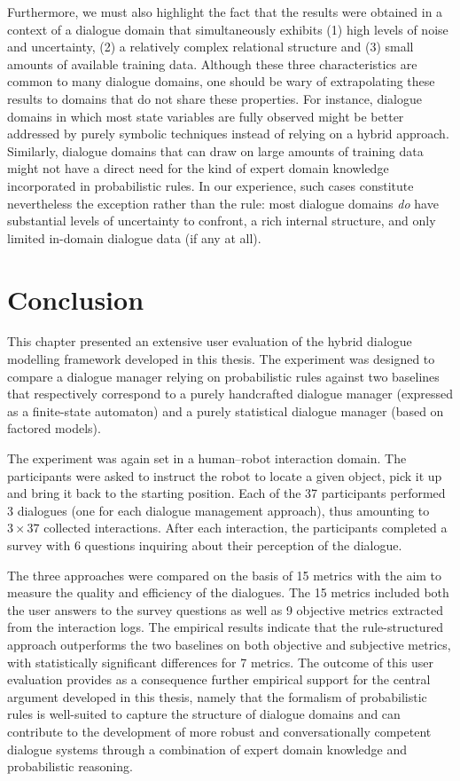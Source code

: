 Furthermore, we must also highlight the fact that the results were obtained in a context of a dialogue domain that simultaneously exhibits (1) high levels of noise and uncertainty, (2) a relatively complex relational structure and (3) small amounts of available training data.  Although these three characteristics are common to many  dialogue domains, one should be wary of extrapolating these results to domains that do not share these properties.  For instance, dialogue domains in which most state variables are fully observed might be better addressed by purely symbolic techniques instead of relying on a hybrid approach. Similarly, dialogue domains that can draw on large amounts of training data might not have a direct need for the kind of expert domain knowledge incorporated in probabilistic rules.   In our experience, such cases constitute nevertheless the exception rather than the rule: most dialogue domains \textit{do} have substantial levels of uncertainty to confront, a rich internal structure, and only limited in-domain dialogue data (if any at all).


\section{Conclusion}

This chapter presented an extensive user evaluation of the hybrid dialogue modelling framework developed in this thesis.  The experiment was designed to compare a dialogue manager relying on probabilistic rules against two baselines that respectively correspond to a purely handcrafted dialogue manager (expressed as a finite-state automaton) and a purely statistical dialogue manager (based on factored models). 

The experiment was again set in a human--robot interaction domain.  The participants were asked to instruct the robot to locate a given object, pick it up and bring it back to the starting position.  Each of the 37 participants performed 3 dialogues (one for each dialogue management approach), thus amounting to $3 \times 37$ collected interactions.  After each interaction, the participants completed a survey with 6 questions inquiring about their perception of the dialogue.  

The three approaches were compared on the basis of 15 metrics with the aim to measure the quality and efficiency of the dialogues. The 15 metrics included both the user answers to the survey questions as well as 9 objective metrics extracted from the interaction logs.   The empirical results indicate that the rule-structured approach outperforms the two baselines on both objective and subjective metrics, with statistically significant differences for 7 metrics. The outcome of this user evaluation provides as a consequence further empirical support for the central argument developed in this thesis, namely that the formalism of probabilistic rules is well-suited to capture the structure of dialogue domains and can contribute to the development of more robust and conversationally competent dialogue systems through a combination of expert domain knowledge and probabilistic reasoning. 


